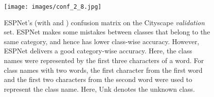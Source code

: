 \documentclass[runningheads]{llncs}
\begin{document}
\clearpage

\begin{figure}[t!]
\centering
\texttt{[image: images/conf\_2\_8.jpg]}
\caption{ESPNet's (with  and ) confusion matrix on the Cityscape \textit{validation} set. ESPNet makes some mistakes between classes that belong to the same category, and hence has lower class-wise accuracy. However, ESPNet delivers a good category-wise accuracy. Here, the class names were represented by the first three characters of a word. For class names with two words, the first character from the first word and the first two characters from the second word were used to represent the class name. Here, Unk denotes the unknown class.}
\label{fig:confMatESPNet}
\end{figure}

\begin{table}[t!]
\centering
\begin{subtable}[b]{\columnwidth}
\centering
{}
\caption{Class-wise comparison on the \textit{test} set}
\label{tab:compareClassSup}
\end{subtable}
\vfill
\begin{subtable}[b]{\columnwidth}
\centering
{}
\end{subtable}
\end{table}
\end{document}
